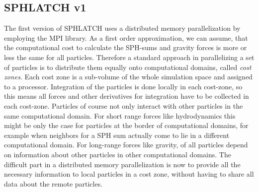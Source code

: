 \subsection{SPHLATCH v1}
The first version of SPHLATCH uses a distributed memory parallelization by employing the MPI library. As a first order approximation, we can assume, that the computational cost to calculate the SPH-sums and gravity forces is more or less the same for all particles. Therefore a standard approach in parallelizing a set of particles is to distribute them equally onto computational domains, called \emph{cost zones}. Each cost zone is a sub-volume of the whole simulation space and assigned to a processor. Integration of the particles is done locally in each cost-zone, so this means all forces and other derivatives for integration have to be collected in each cost-zone. Particles of course not only interact with other particles in the same computational domain. For short range forces like hydrodynamics this might be only the case for particles at the border of computational domains, for example when neighbors for a SPH sum actually come to lie in a different computational domain. For long-range forces like gravity, of all particles depend on information about other particles in other computational domains. The difficult part in a distributed memory parallelization is now to provide all the necessary information to local particles in a cost zone, without having to share all data about the remote particles. 

